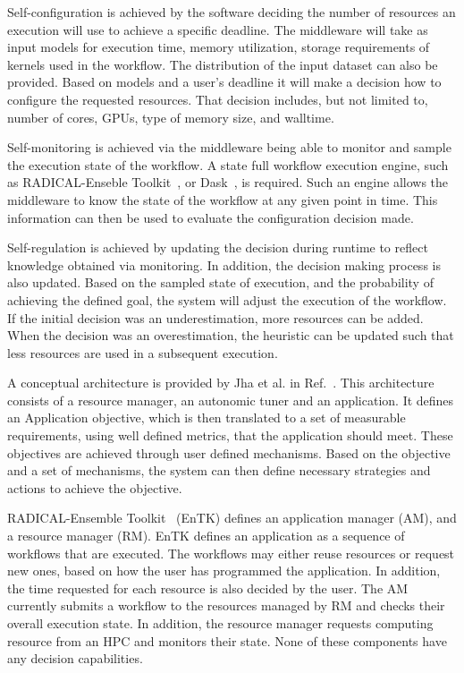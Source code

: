 Self-configuration is achieved by the software deciding the number of resources 
an execution will use to achieve a specific deadline. The middleware will take as 
input models for execution time, memory utilization, storage requirements of kernels used in the workflow. The distribution of the input dataset can also be provided. Based on models 
and a user's deadline it will make a decision how to configure the requested 
resources. That decision includes, but not limited to, number of cores, GPUs, 
type of memory size, and walltime.

Self-monitoring is achieved via the middleware being able to monitor and sample 
the execution state of the workflow. A state full workflow execution engine, such as 
RADICAL-Enseble Toolkit~\cite{balasubramanian2018harnessing}, or Dask~\cite{rocklin2015dask}, 
is required. Such an engine allows the middleware to know the state of the workflow 
at any given point in time. This information can then be used to evaluate the 
configuration decision made.

Self-regulation is achieved by updating the decision during runtime to reflect 
knowledge obtained via monitoring. In addition, the decision making process 
is also updated. Based on the sampled state of execution, and the probability 
of achieving the defined goal, the system will adjust the execution of the 
workflow. If the initial decision was an underestimation, 
more resources can be added. When the decision was an overestimation, the heuristic 
can be updated such that less resources are used in a subsequent execution.

A conceptual architecture is provided by Jha et al. in Ref.~\cite{jha2009self}. 
This architecture consists of a resource manager, an autonomic tuner and an application. 
It defines an Application objective, which is then translated to a set of measurable 
requirements, using well defined metrics, that the application should meet. These 
objectives are achieved through user defined mechanisms. Based on the objective and 
a set of mechanisms, the system can then define necessary strategies and actions to 
achieve the objective.

RADICAL-Ensemble Toolkit~\cite{balasubramanian2018harnessing} (EnTK) defines 
an application manager (AM), and a resource manager (RM). EnTK defines an 
application as a sequence of workflows that are executed. The workflows may 
either reuse resources or request new ones, based on how the user has programmed 
the application. In addition, the time requested for each resource is also 
decided by the user. The AM currently submits a workflow to the resources 
managed by RM and checks their overall execution state. In addition, the resource 
manager requests computing resource from an HPC and monitors their state. None 
of these components have any decision capabilities.

